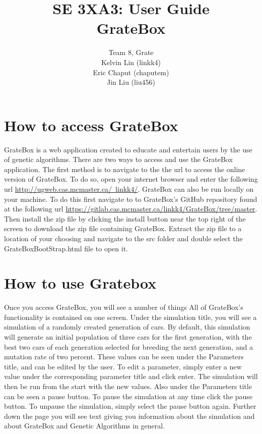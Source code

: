 \documentclass{article}
\title{SE 3XA3: User Guide\\GrateBox}
\author{Team 8, Grate
		\\ Kelvin Lin (linkk4)
		\\ Eric Chaput (chaputem)
		\\ Jin Liu (liu456)
}
\date{}
\begin{document}
\newpage

\maketitle

\section{How to access GrateBox}

GrateBox is a web application created to educate and entertain users by the use 
of genetic algorithms. There are two ways to access and use the GrateBox 
application. The first method is to navigate to the the url to access the 
online version of GrateBox. To do so, open your internet browser and enter the 
following url 
\href{http://ugweb.cas.mcmaster.ca/~linkk4/}{http://ugweb.cas.mcmaster.ca/~linkk4/}. 
GrateBox can also be run locally on your machine. To do this first navigate to 
to GrateBox's GitHub repository found at the following url 
\href{https://gitlab.cas.mcmaster.ca/linkk4/GrateBox/tree/master}{https://gitlab.cas.mcmaster.ca/linkk4/GrateBox/tree/master}. 
Then install the zip file by clicking the install button near the top right of 
the screen to download the zip file containing GrateBox. Extract the zip file to 
a location of your choosing and navigate to the src folder and double select the 
GrateBoxBootStrap.html file to open it.

\section {How to use Gratebox}

Once you access GrateBox, you will see a number of things All of GrateBox's 
functionality is contained on one screen. Under the simulation title, you will 
see a simulation of a randomly created generation of cars. By default, this 
simulation will generate an initial population of three cars for the first 
generation, with the best two cars of each generation selected for breeding the 
next generation, and a mutation rate of two percent. These values can be seen 
under the Parameters title, and can be edited by the user. To edit a parameter, 
simply enter a new value under the corresponding parameter title and click 
enter. The simulation will then be run from the start with the new values. Also 
under the Parameters title can be seen a pause button. To pause the simulation 
at any time click the pause button. To unpause the simulation, simply select the 
pause button again. Further down the page you will see text giving you 
information about the simulation and about GrateBox and Genetic Algorithms in 
general.
\end{document}
